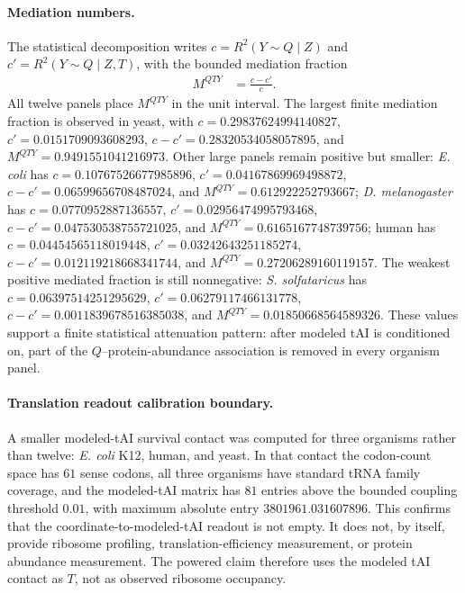 \paragraph{Mediation numbers.}
The statistical decomposition writes $c=R^2(Y\sim Q\mid Z)$ and $c'=R^2(Y\sim Q\mid Z,T)$, with the bounded mediation fraction
$$
\begin{aligned}
M^{QTY}&=\frac{c-c'}{c}.
\end{aligned}
$$
All twelve panels place $M^{QTY}$ in the unit interval.  The largest finite mediation fraction is observed in yeast, with $c=0.29837624994140827$, $c'=0.0151709093608293$, $c-c'=0.28320534058057895$, and $M^{QTY}=0.9491551041216973$.  Other large panels remain positive but smaller: \emph{E. coli} has $c=0.10767526677985896$, $c'=0.04167869969498872$, $c-c'=0.06599656708487024$, and $M^{QTY}=0.612922252793667$; \emph{D. melanogaster} has $c=0.0770952887136557$, $c'=0.02956474995793468$, $c-c'=0.047530538755721025$, and $M^{QTY}=0.6165167748739756$; human has $c=0.04454565118019448$, $c'=0.03242643251185274$, $c-c'=0.012119218668341744$, and $M^{QTY}=0.27206289160119157$.  The weakest positive mediated fraction is still nonnegative: \emph{S. solfataricus} has $c=0.06397514251295629$, $c'=0.06279117466131778$, $c-c'=0.0011839678516385038$, and $M^{QTY}=0.01850668564589326$.  These values support a finite statistical attenuation pattern: after modeled tAI is conditioned on, part of the $Q$--protein-abundance association is removed in every organism panel.

\paragraph{Translation readout calibration boundary.}
A smaller modeled-tAI survival contact was computed for three organisms rather than twelve: \emph{E. coli} K12, human, and yeast.  In that contact the codon-count space has $61$ sense codons, all three organisms have standard tRNA family coverage, and the modeled-tAI matrix has $81$ entries above the bounded coupling threshold $0.01$, with maximum absolute entry $3801961.031607896$.  This confirms that the coordinate-to-modeled-tAI readout is not empty.  It does not, by itself, provide ribosome profiling, translation-efficiency measurement, or protein abundance measurement.  The powered claim therefore uses the modeled tAI contact as $T$, not as observed ribosome occupancy.

